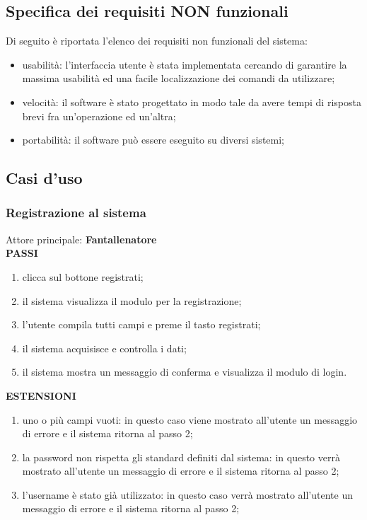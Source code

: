 \documentclass[12pt,a4paper]{article}
\begin{document}
\subsection{Specifica dei requisiti NON funzionali}
Di seguito è riportata l'elenco dei requisiti non funzionali del sistema:
\begin{itemize}
\item usabilità: l'interfaccia utente è stata implementata cercando di garantire la massima usabilità ed una facile localizzazione dei comandi da utilizzare;
\item velocità: il software è stato progettato in modo tale da avere tempi di risposta brevi fra un'operazione ed un'altra;
\item portabilità: il software può essere eseguito su diversi sistemi;
\end{itemize}
\subsection{Casi d'uso}
\subsubsection{Registrazione al sistema}
Attore principale: \textbf{Fantallenatore}\\
\newline
\textbf{PASSI}
\begin{enumerate}
\item clicca sul bottone registrati;
\item il sistema visualizza il modulo per la registrazione;
\item l'utente compila tutti campi e preme il tasto registrati;
\item il sistema acquisisce e controlla i dati;
\item il sistema mostra un messaggio di conferma e visualizza il modulo di login.
\end{enumerate}
\textbf{ESTENSIONI}
\begin{enumerate}
\item uno o più campi vuoti: in questo caso viene mostrato all'utente un messaggio di errore e il sistema ritorna al passo 2;
\item la password non rispetta gli standard definiti dal sistema: in questo verrà mostrato all'utente un messaggio di errore e il sistema ritorna al passo 2;
\item l'username è stato già utilizzato: in questo caso verrà mostrato all'utente un messaggio di errore e il sistema ritorna al passo 2;
\end{enumerate}
\end{document}
